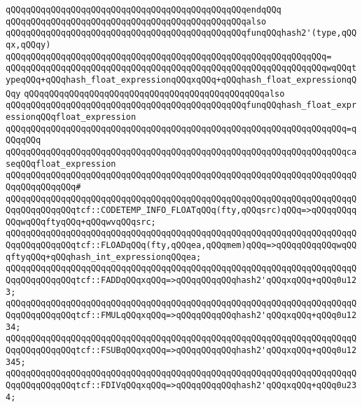 \verb|qQQqqQQqqQQqqQQqqQQqqQQqqQQqqQQqqQQqqQQqqQQqqQQqendqQQq|\newline
\newline
\verb|qQQqqQQqqQQqqQQqqQQqqQQqqQQqqQQqqQQqqQQqqQQqqQQqalso|\newline
\verb|qQQqqQQqqQQqqQQqqQQqqQQqqQQqqQQqqQQqqQQqqQQqqQQqfunqQQqhash2'(type,qQQqx,qQQqy)|\newline
\verb|qQQqqQQqqQQqqQQqqQQqqQQqqQQqqQQqqQQqqQQqqQQqqQQqqQQqqQQqqQQqqQQq=|\newline
\verb|qQQqqQQqqQQqqQQqqQQqqQQqqQQqqQQqqQQqqQQqqQQqqQQqqQQqqQQqqQQqqQQqwqQQqtypeqQQq+qQQqhash_float_expressionqQQqxqQQq+qQQqhash_float_expressionqQQqy|\newline
\newline
\verb|qQQqqQQqqQQqqQQqqQQqqQQqqQQqqQQqqQQqqQQqqQQqqQQqalso|\newline
\verb|qQQqqQQqqQQqqQQqqQQqqQQqqQQqqQQqqQQqqQQqqQQqqQQqfunqQQqhash_float_expressionqQQqfloat_expression|\newline
\verb|qQQqqQQqqQQqqQQqqQQqqQQqqQQqqQQqqQQqqQQqqQQqqQQqqQQqqQQqqQQqqQQqqQQq=qQQqqQQq|\newline
\verb|qQQqqQQqqQQqqQQqqQQqqQQqqQQqqQQqqQQqqQQqqQQqqQQqqQQqqQQqqQQqqQQqqQQqcaseqQQqfloat_expression|\newline
\verb|qQQqqQQqqQQqqQQqqQQqqQQqqQQqqQQqqQQqqQQqqQQqqQQqqQQqqQQqqQQqqQQqqQQqqQQqqQQqqQQqqQQq#|\newline
\verb|qQQqqQQqqQQqqQQqqQQqqQQqqQQqqQQqqQQqqQQqqQQqqQQqqQQqqQQqqQQqqQQqqQQqqQQqqQQqqQQqqQQqtcf::CODETEMP_INFO_FLOATqQQq(fty,qQQqsrc)qQQq=>qQQqqQQqqQQqwqQQqftyqQQq+qQQqwvqQQqsrc;|\newline
\verb|qQQqqQQqqQQqqQQqqQQqqQQqqQQqqQQqqQQqqQQqqQQqqQQqqQQqqQQqqQQqqQQqqQQqqQQqqQQqqQQqqQQqtcf::FLOADqQQq(fty,qQQqea,qQQqmem)qQQq=>qQQqqQQqqQQqwqQQqftyqQQq+qQQqhash_int_expressionqQQqea;|\newline
\verb|qQQqqQQqqQQqqQQqqQQqqQQqqQQqqQQqqQQqqQQqqQQqqQQqqQQqqQQqqQQqqQQqqQQqqQQqqQQqqQQqqQQqtcf::FADDqQQqxqQQq=>qQQqqQQqqQQqhash2'qQQqxqQQq+qQQq0u123;|\newline
\verb|qQQqqQQqqQQqqQQqqQQqqQQqqQQqqQQqqQQqqQQqqQQqqQQqqQQqqQQqqQQqqQQqqQQqqQQqqQQqqQQqqQQqtcf::FMULqQQqxqQQq=>qQQqqQQqqQQqhash2'qQQqxqQQq+qQQq0u1234;|\newline
\verb|qQQqqQQqqQQqqQQqqQQqqQQqqQQqqQQqqQQqqQQqqQQqqQQqqQQqqQQqqQQqqQQqqQQqqQQqqQQqqQQqqQQqtcf::FSUBqQQqxqQQq=>qQQqqQQqqQQqhash2'qQQqxqQQq+qQQq0u12345;|\newline
\verb|qQQqqQQqqQQqqQQqqQQqqQQqqQQqqQQqqQQqqQQqqQQqqQQqqQQqqQQqqQQqqQQqqQQqqQQqqQQqqQQqqQQqtcf::FDIVqQQqxqQQq=>qQQqqQQqqQQqhash2'qQQqxqQQq+qQQq0u234;|\newline
